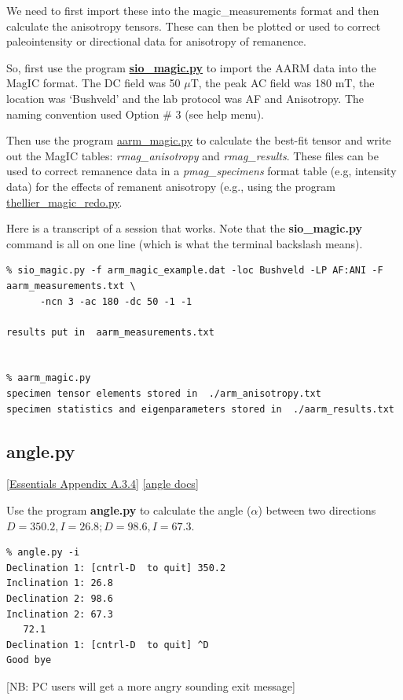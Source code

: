 \documentclass[11pt]{book}
\begin{document}
{ We need to first import these into the magic\_measurements format and then calculate the anisotropy tensors.  These can then be plotted or used to correct paleointensity or directional data for anisotropy of remanence.

So,  first use the program \href{#sio_magic.py}{\bf sio\_magic.py}  to import the AARM data  into the MagIC format.  The DC field was 50 $\mu$T, the peak AC field was 180 mT, the location was `Bushveld' and the lab protocol was AF and Anisotropy.   The naming convention used Option \# 3 (see help menu).

Then use the program \href{#aarm_magic.py}{aarm\_magic.py}  to calculate the best-fit tensor and write out the MagIC tables: {\it rmag\_anisotropy} and {\it rmag\_results}.   These files can be used to correct remanence data in a {\it pmag\_specimens} format table (e.g, intensity data) for the effects of remanent anisotropy (e.g., using the program \href{#thellier_magic.py}{thellier\_magic\_redo.py}.

Here is a transcript of a session that works.   Note that the {\bf  sio\_magic.py}  command is all on one line (which is what the terminal backslash means).

\begin{verbatim}
% sio_magic.py -f arm_magic_example.dat -loc Bushveld -LP AF:ANI -F aarm_measurements.txt \
      -ncn 3 -ac 180 -dc 50 -1 -1

results put in  aarm_measurements.txt


% aarm_magic.py
specimen tensor elements stored in  ./arm_anisotropy.txt
specimen statistics and eigenparameters stored in  ./aarm_results.txt

\end{verbatim}


%
\subsection{angle.py } [\href{http://earthref.org/MAGIC/books/Tauxe/Essentials/WebBook3ap1.html#Vector_multiplication}{Essentials Appendix A.3.4}]
\href{https://github.com/PmagPy/PmagPy/blob/master/programs/angle.py}{[angle docs]}


 Use the program {\bf angle.py} to calculate the angle ($\alpha$) between two directions $D=350.2, I=26.8; D=98.6, I=67.3$.

\begin{verbatim}
% angle.py -i
Declination 1: [cntrl-D  to quit] 350.2
Inclination 1: 26.8
Declination 2: 98.6
Inclination 2: 67.3
   72.1
Declination 1: [cntrl-D  to quit] ^D
Good bye
\end{verbatim}
 [NB: PC users will get a more angry sounding exit message]

}
\end{document}
